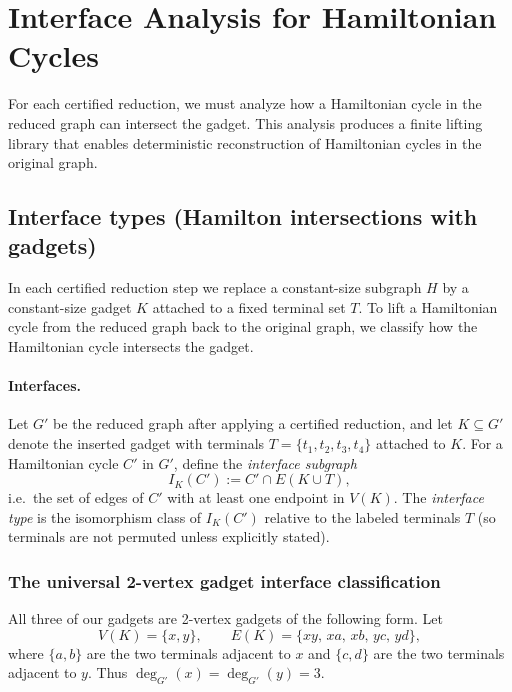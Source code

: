 \documentclass[12pt]{article}
\theoremstyle{definition}
\newcommand{\CtwoGadgetVertices}{2}
\begin{document}
\bigskip


\section{Interface Analysis for Hamiltonian Cycles}
\label{sec:interface-analysis}

For each certified reduction, we must analyze how a Hamiltonian cycle in the reduced graph can intersect the gadget. This analysis produces a finite lifting library that enables deterministic reconstruction of Hamiltonian cycles in the original graph.

\subsection{Interface types (Hamilton intersections with gadgets)}
\label{subsec:interface-types}

In each certified reduction step we replace a constant-size subgraph $H$ by a
constant-size gadget $K$ attached to a fixed terminal set $T$.
To lift a Hamiltonian cycle from the reduced graph back to the original graph,
we classify how the Hamiltonian cycle intersects the gadget.

\paragraph{Interfaces.}
Let $G'$ be the reduced graph after applying a certified reduction, and let
$K\subseteq G'$ denote the inserted gadget with terminals $T=\{t_1,t_2,t_3,t_4\}$
attached to $K$.
For a Hamiltonian cycle $C'$ in $G'$, define the \emph{interface subgraph}
\[
I_K(C') := C' \cap E(K\cup T),
\]
i.e.\ the set of edges of $C'$ with at least one endpoint in $V(K)$.
The \emph{interface type} is the isomorphism class of $I_K(C')$ relative to the
labeled terminals $T$ (so terminals are not permuted unless explicitly stated).

\medskip

\subsubsection{The universal \CtwoGadgetVertices-vertex gadget interface classification}
\label{subsubsec:2vertex-interface-classification}

All three of our gadgets are \CtwoGadgetVertices-vertex gadgets of the following form.
Let
\[
V(K)=\{x,y\},\qquad
E(K)=\{xy,\, xa,\, xb,\, yc,\, yd\},
\]
where $\{a,b\}$ are the two terminals adjacent to $x$ and $\{c,d\}$ are the two
terminals adjacent to $y$.  Thus $\deg_{G'}(x)=\deg_{G'}(y)=3$.
\end{document}
